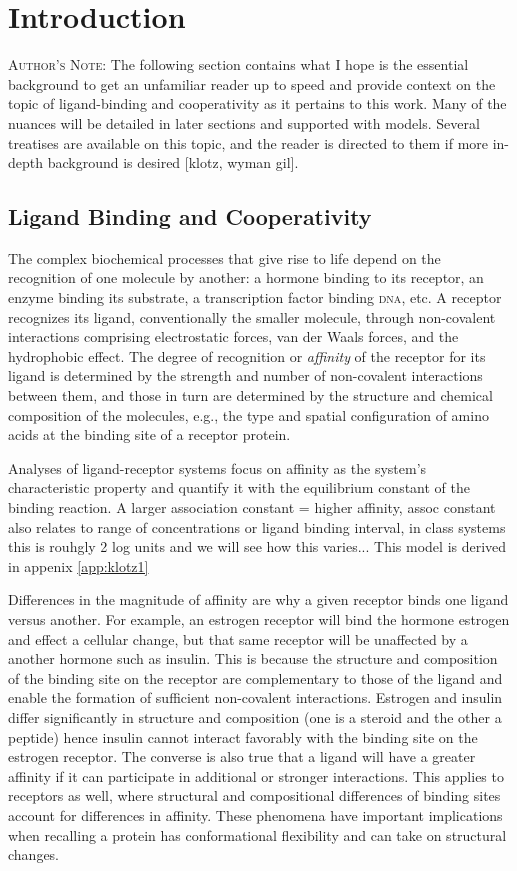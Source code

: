 \section{Introduction}

\textsc{Author's Note}: The following section contains what I hope is the essential background to get an unfamiliar reader up to speed and provide context on the topic of ligand-binding and cooperativity as it pertains to this work. Many of the nuances will be detailed in later sections and supported with models. Several treatises are available on this topic, and the reader is directed to them if more in-depth background is desired [klotz, wyman gil].

\subsection{Ligand Binding and Cooperativity}

The complex biochemical processes that give rise to life depend on the recognition of one molecule by another: a hormone binding to its receptor, an enzyme binding its substrate, a transcription factor binding \textsc{dna}, etc. A receptor recognizes its ligand, conventionally the smaller molecule, through non-covalent interactions comprising electrostatic forces, van der Waals forces, and the hydrophobic effect. The degree of recognition or \emph{affinity} of the receptor for its ligand is determined by the strength and number of non-covalent interactions between them, and those in turn are determined by the structure and chemical composition of the molecules, e.g., the type and spatial configuration of amino acids at the binding site of a receptor protein. 

Analyses of ligand-receptor systems focus on affinity as the system's characteristic property and quantify it with the equilibrium constant of the binding reaction. A larger association constant = higher affinity, assoc constant also relates to range of concentrations or ligand binding interval, in class systems this is rouhgly 2 log units and we will see how this varies... This model is derived in appenix \ref{app:klotz1}

Differences in the magnitude of affinity are why a given receptor binds one ligand versus another. For example, an estrogen receptor will bind the hormone estrogen and effect a cellular change, but that same receptor will be unaffected by a another hormone such as insulin. This is because the structure and composition of the binding site on the receptor are complementary to those of the ligand and enable the formation of sufficient non-covalent interactions. Estrogen and insulin differ significantly in structure and composition (one is a steroid and the other a peptide) hence insulin cannot interact favorably with the binding site on the estrogen receptor. The converse is also true that a ligand will have a greater affinity if it can participate in additional or stronger interactions. This applies to receptors as well, where structural and compositional differences of binding sites account for differences in affinity. These phenomena have important implications when recalling a protein has conformational flexibility and can take on structural changes.

